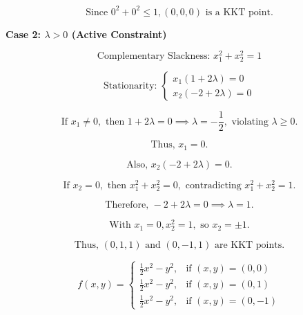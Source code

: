 \documentclass{article}
\begin{document}
\begin{equation}
\text{Since } 0^2 + 0^2 \leq 1, (0, 0, 0) \text{ is a KKT point.}
\end{equation}

\textbf{Case 2: $\lambda > 0$ (Active Constraint)}

\begin{equation}
\text{Complementary Slackness: } x_1^2 + x_2^2 = 1
\end{equation}

\begin{equation}
\text{Stationarity: } 
\begin{cases}
x_1(1 + 2\lambda) = 0 \\
x_2(-2 + 2\lambda) = 0
\end{cases}
\end{equation}

\begin{equation}
\text{If } x_1 \neq 0, \text{ then } 1 + 2\lambda = 0 \implies \lambda = -\frac{1}{2}, \text{ violating } \lambda \geq 0.
\end{equation}

\begin{equation}
\text{Thus, } x_1 = 0.
\end{equation}

\begin{equation}
\text{Also, } x_2(-2 + 2\lambda) = 0.
\end{equation}

\begin{equation}
\text{If } x_2 = 0, \text{ then } x_1^2 + x_2^2 = 0, \text{ contradicting } x_1^2 + x_2^2 = 1.
\end{equation}

\begin{equation}
\text{Therefore, } -2 + 2\lambda = 0 \implies \lambda = 1.
\end{equation}

\begin{equation}
\text{With } x_1 = 0, x_2^2 = 1, \text{ so } x_2 = \pm 1.
\end{equation}

\begin{equation}
\text{Thus, } (0, 1, 1) \text{ and } (0, -1, 1) \text{ are KKT points.}
\end{equation}

\begin{equation}
f(x,y) = \begin{cases}
\frac{1}{2}x^2 - y^2, & \text{if } (x,y) = (0,0) \\
\frac{1}{2}x^2 - y^2, & \text{if } (x,y) = (0,1) \\
\frac{1}{2}x^2 - y^2, & \text{if } (x,y) = (0,-1)
\end{cases}
\end{equation}
\end{document}

